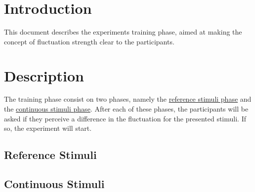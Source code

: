 \documentclass[a4paper]{article}
\begin{document}

\section{Introduction} %
\label{sec:introduction}

This document describes the experiment\textquotesingle s training phase, aimed
at making the concept of fluctuation strength clear to the participants.


\section{Description} %
\label{sec:description}

The training phase consist on two phases, namely the
\hyperref[sub:reference_stimuli]{reference stimuli phase} and the
\hyperref[sub:continuous_stimuli]{continuous stimuli phase}. After each of these
phases, the participants will be asked if they perceive a difference in the
fluctuation for the presented stimuli. If so, the experiment will start.

\subsection{Reference Stimuli} %
\label{sub:reference_stimuli}


\subsection{Continuous Stimuli} %
\label{sub:continuous_stimuli}


\end{document}
